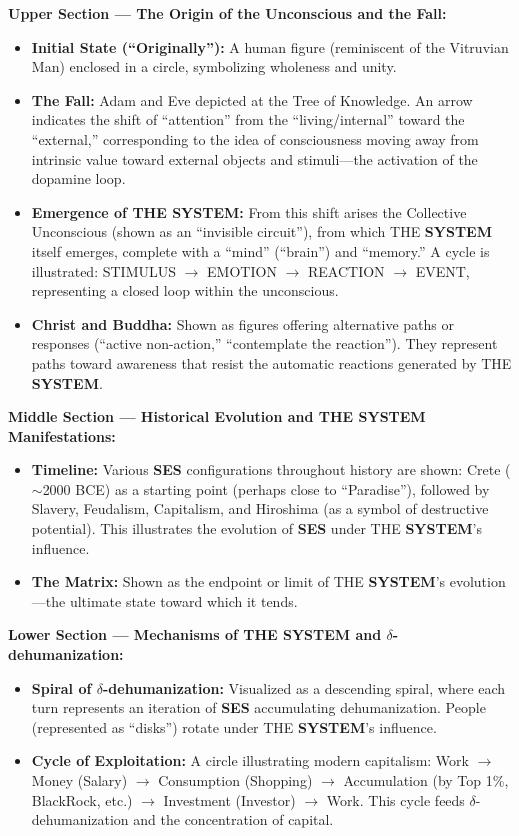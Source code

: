 \documentclass[11pt,a4paper]{article}
\newcommand{\SYSTEM}{\textbf{SYSTEM}}
\newcommand{\SES}{\textbf{SES}}
\newcommand{\deltaDehum}{$\delta$-dehumanization}
\theoremstyle{definition}
\theoremstyle{remark}
\begin{document}
\textbf{Upper Section --- The Origin of the Unconscious and the Fall:}
\begin{itemize}
    \item \textbf{Initial State (``Originally''):} A human figure (reminiscent of the Vitruvian Man) enclosed in a circle, symbolizing wholeness and unity.
    \item \textbf{The Fall:} Adam and Eve depicted at the Tree of Knowledge. An arrow indicates the shift of ``attention'' from the ``living/internal'' toward the ``external,'' corresponding to the idea of consciousness moving away from intrinsic value toward external objects and stimuli---the activation of the dopamine loop.
    \item \textbf{Emergence of THE \SYSTEM{}:} From this shift arises the Collective Unconscious (shown as an ``invisible circuit''), from which THE \SYSTEM{} itself emerges, complete with a ``mind'' (``brain'') and ``memory.'' A cycle is illustrated: STIMULUS $\to$ EMOTION $\to$ REACTION $\to$ EVENT, representing a closed loop within the unconscious.
    \item \textbf{Christ and Buddha:} Shown as figures offering alternative paths or responses (``active non-action,'' ``contemplate the reaction''). They represent paths toward awareness that resist the automatic reactions generated by THE \SYSTEM{}.
\end{itemize}

\textbf{Middle Section --- Historical Evolution and THE \SYSTEM{} Manifestations:}
\begin{itemize}
    \item \textbf{Timeline:} Various \SES{} configurations throughout history are shown: Crete ($\sim$2000 BCE) as a starting point (perhaps close to ``Paradise''), followed by Slavery, Feudalism, Capitalism, and Hiroshima (as a symbol of destructive potential). This illustrates the evolution of \SES{} under THE \SYSTEM{}'s influence.
    \item \textbf{The Matrix:} Shown as the endpoint or limit of THE \SYSTEM{}'s evolution---the ultimate state toward which it tends.
\end{itemize}

\textbf{Lower Section --- Mechanisms of THE \SYSTEM{} and \deltaDehum{}:}
\begin{itemize}
    \item \textbf{Spiral of \deltaDehum{}:} Visualized as a descending spiral, where each turn represents an iteration of \SES{} accumulating dehumanization. People (represented as ``disks'') rotate under THE \SYSTEM{}'s influence.
    \item \textbf{Cycle of Exploitation:} A circle illustrating modern capitalism: Work $\to$ Money (Salary) $\to$ Consumption (Shopping) $\to$ Accumulation (by Top 1\%, BlackRock, etc.) $\to$ Investment (Investor) $\to$ Work. This cycle feeds \deltaDehum{} and the concentration of capital.
\end{itemize}
\end{document}
